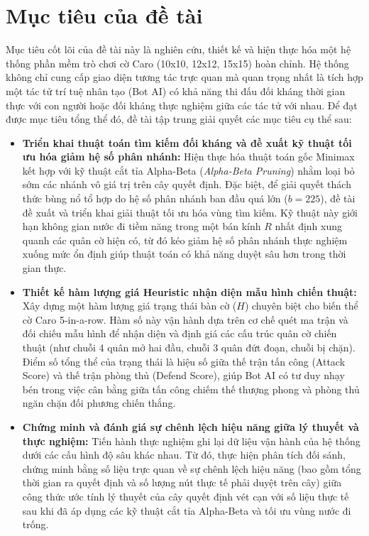 \section{Mục tiêu của đề tài}

Mục tiêu cốt lõi của đề tài này là nghiên cứu, thiết kế và hiện thực hóa một hệ thống phần mềm trò chơi cờ Caro (10x10, 12x12, 15x15) hoàn chỉnh. Hệ thống không chỉ cung cấp giao diện tương tác trực quan mà quan trọng nhất là tích hợp một tác tử trí tuệ nhân tạo (Bot AI) có khả năng thi đấu đối kháng thời gian thực với con người hoặc đối kháng thực nghiệm giữa các tác tử với nhau. Để đạt được mục tiêu tổng thể đó, đề tài tập trung giải quyết các mục tiêu cụ thể sau:

\begin{itemize}
	\item \textbf{Triển khai thuật toán tìm kiếm đối kháng và đề xuất kỹ thuật tối ưu hóa giảm hệ số phân nhánh:} Hiện thực hóa thuật toán gốc Minimax kết hợp với kỹ thuật cắt tỉa Alpha-Beta (\textit{Alpha-Beta Pruning}) nhằm loại bỏ sớm các nhánh vô giá trị trên cây quyết định. Đặc biệt, để giải quyết thách thức bùng nổ tổ hợp do hệ số phân nhánh ban đầu quá lớn ($b = 225$), đề tài đề xuất và triển khai giải thuật tối ưu hóa vùng tìm kiếm. Kỹ thuật này giới hạn không gian nước đi tiềm năng trong một bán kính $R$ nhất định xung quanh các quân cờ hiện có, từ đó kéo giảm hệ số phân nhánh thực nghiệm xuống mức ổn định giúp thuật toán có khả năng duyệt sâu hơn trong thời gian thực.
	
	\item \textbf{Thiết kế hàm lượng giá Heuristic nhận diện mẫu hình chiến thuật:} Xây dựng một hàm lượng giá trạng thái bàn cờ ($H$) chuyên biệt cho biến thể cờ Caro 5-in-a-row. Hàm số này vận hành dựa trên cơ chế quét ma trận và đối chiếu mẫu hình để nhận diện và định giá các cấu trúc quân cờ chiến thuật (như chuỗi 4 quân mở hai đầu, chuỗi 3 quân đứt đoạn, chuỗi bị chặn). Điểm số tổng thể của trạng thái là hiệu số giữa thế trận tấn công (Attack Score) và thế trận phòng thủ (Defend Score), giúp Bot AI có tư duy nhạy bén trong việc cân bằng giữa tấn công chiếm thế thượng phong và phòng thủ ngăn chặn đối phương chiến thắng.
	
	\item \textbf{Chứng minh và đánh giá sự chênh lệch hiệu năng giữa lý thuyết và thực nghiệm:} Tiến hành thực nghiệm ghi lại dữ liệu vận hành của hệ thống dưới các cấu hình độ sâu khác nhau. Từ đó, thực hiện phân tích đối sánh, chứng minh bằng số liệu trực quan về sự chênh lệch hiệu năng (bao gồm tổng thời gian ra quyết định và số lượng nút thực tế phải duyệt trên cây) giữa công thức ước tính lý thuyết của cây quyết định vét cạn với số liệu thực tế sau khi đã áp dụng các kỹ thuật cắt tỉa Alpha-Beta và tối ưu vùng nước đi trống.
\end{itemize}


